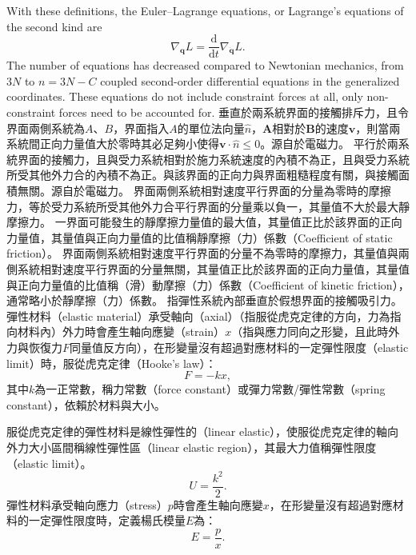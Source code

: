 \documentclass[a4paper,12pt]{article}
\begin{document}
With these definitions, the Euler–Lagrange equations, or Lagrange's equations of the second kind are
\[\nabla_{\mathbf{q}}L=\frac{\mathrm{d}}{\mathrm{d}t}\nabla_{\dot{\mathbf{q}}}L.\]
The number of equations has decreased compared to Newtonian mechanics, from $3N$ to $n = 3N − C$ coupled second-order differential equations in the generalized coordinates. These equations do not include constraint forces at all, only non-constraint forces need to be accounted for.
垂直於兩系統界面的接觸排斥力，且令界面兩側系統為$A$、$B$，界面指入$A$的單位法向量$\hat{n}$，$\mathbf{A}$相對於$\mathbf{B}$的速度$\mathbf{v}$，則當兩系統間正向力量值大於零時其必足夠小使得$\mathbf{v}\cdot\hat{n}\leq 0$。源自於電磁力。
平行於兩系統界面的接觸力，且與受力系統相對於施力系統速度的內積不為正，且與受力系統所受其他外力合的內積不為正。與該界面的正向力與界面粗糙程度有關，與接觸面積無關。源自於電磁力。
界面兩側系統相對速度平行界面的分量為零時的摩擦力，等於受力系統所受其他外力合平行界面的分量乘以負一，其量值不大於最大靜摩擦力。
一界面可能發生的靜摩擦力量值的最大值，其量值正比於該界面的正向力量值，其量值與正向力量值的比值稱靜摩擦（力）係數（Coefficient of static friction）。
界面兩側系統相對速度平行界面的分量不為零時的摩擦力，其量值與兩側系統相對速度平行界面的分量無關，其量值正比於該界面的正向力量值，其量值與正向力量值的比值稱（滑）動摩擦（力）係數（Coefficient of kinetic friction），通常略小於靜摩擦（力）係數。
指彈性系統內部垂直於假想界面的接觸吸引力。
彈性材料（elastic material）承受軸向（axial）（指服從虎克定律的方向，力為指向材料內）外力時會產生軸向應變（strain）$x$（指與應力同向之形變，且此時外力與恢復力$F$同量值反方向），在形變量沒有超過對應材料的一定彈性限度（elastic limit）時，服從虎克定律（Hooke's law）：
\[F=-kx,\]
其中$k$為一正常數，稱力常數（force constant）或彈力常數/彈性常數（spring constant），依賴於材料與大小。

服從虎克定律的彈性材料是線性彈性的（linear elastic），使服從虎克定律的軸向外力大小區間稱線性彈性區（linear elastic region），其最大力值稱彈性限度（elastic limit）。
\[U=\frac{k^2}{2}.\]
彈性材料承受軸向應力（stress）$p$時會產生軸向應變$x$，在形變量沒有超過對應材料的一定彈性限度時，定義楊氏模量$E$為：
\[E=\frac{p}{x}.\]
\end{document}
